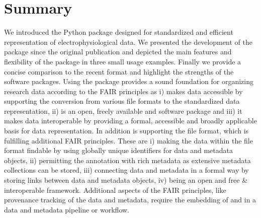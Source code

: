 \section{Summary}
We introduced the  Python package designed for standardized and efficient representation of electrophysiological data. We presented the development of the package since the original publication and depicted the main features and flexibility of the package in three small usage examples. Finally we provide a concise comparison to the recent  format and highlight the strengths of the software packages.
Using the  package provides a sound foundation for organizing research data according to the FAIR principles as  i) makes data accessible by supporting the conversion from various file formats to the standardized  data representation, ii) is an open, freely available and software package and iii) it makes data interoperable by providing a formal, accessible and broadly applicable basis for data representation. In addition  is supporting the  file format, which is fulfilling additional FAIR principles. These are i) making the data within the file format findable by using globally unique identifiers for data and metadata objects, ii) permitting the annotation with rich metadata as extensive metadata collections can be stored, iii) connecting data and metadata in a formal way by storing links between data and metadata objects, iv) being an open and free \& interoperable framework.
Additional aspects of the FAIR principles, like provenance tracking of the data and metadata, require the embedding of  and  in a data and metadata pipeline or workflow.


